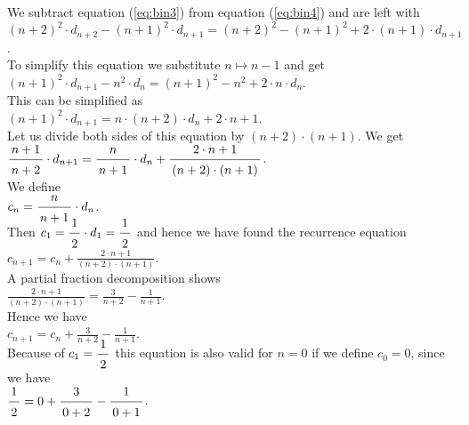 We subtract equation  (\ref{eq:bin3}) from equation (\ref{eq:bin4})
and are left with \\[0.2cm]
\hspace*{1.3cm} 
$(n+2)^2 \cdot d_{n+2} - (n+1)^2 \cdot d_{n+1} = (n+2)^2 - (n+1)^2 + 2 \cdot (n+1) \cdot d_{n+1}$.
\\[0.2cm]
To simplify this equation we substitute  $n \mapsto n - 1$ and get \\[0.2cm]
\hspace*{1.3cm} 
$(n+1)^2 \cdot d_{n+1} - n^2 \cdot d_{n} = (n+1)^2 - n^2 + 2 \cdot n \cdot d_{n}$.
\\[0.2cm]
This can be simplified as \\[0.2cm]
\hspace*{1.3cm} $(n+1)^2 \cdot d_{n+1}  =  n \cdot (n + 2) \cdot d_{n} + 2 \cdot n + 1$. \\[0.2cm]
Let us divide both sides of this equation by $(n+2)\cdot (n+1)$.  We get \\[0.2cm]
\hspace*{1.3cm}  
$\displaystyle \bruch{n+1}{n+2} \cdot d_{n+1}  =  \bruch{n}{n + 1} \cdot d_{n} + \bruch{2 \cdot n + 1}{(n+2)\cdot (n+1)}$. \\[0.2cm]
We define \\[0.2cm]
\hspace*{1.3cm} $\displaystyle c_n = \bruch{n}{n+1} \cdot d_n$. \\[0.4cm]
Then $c_1 = \bruch{1}{2} \cdot d_1 = \bruch{1}{2}$ and hence we have found the recurrence equation \\[0.2cm]
\hspace*{1.3cm} 
$\displaystyle c_{n+1}  =  c_{n} + \frac{2 \cdot n + 1}{(n+2)\cdot (n+1)}$. \\[0.2cm]
A partial fraction decomposition shows \\[0.2cm]
\hspace*{1.3cm} 
$\displaystyle \frac{2 \cdot n + 1}{(n+2)\cdot (n+1)} = \frac{3}{n+2} - \frac{1}{n+1}$. \\[0.2cm]
Hence we have \\[0.2cm]
\hspace*{1.3cm} $\displaystyle c_{n+1} = c_n +  \frac{3}{n+2} - \frac{1}{n+1}$. \\[0.2cm]
Because of $c_1 = \bruch{1}{2}$ this equation is also valid for  $n=0$ if we define $c_0 = 0$, since
we have
\\[0.2cm]
\hspace*{1.3cm}
$\bruch{1}{2} = 0 + \bruch{3}{0+2} - \bruch{1}{0+1}$.
\\[0.2cm]
